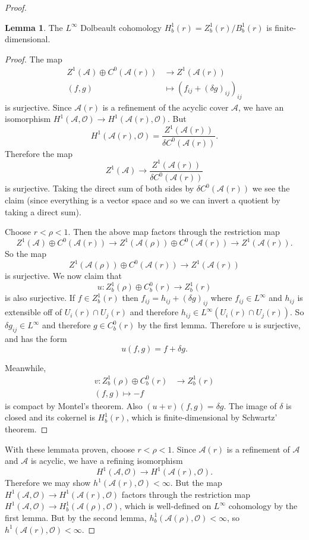 \documentclass[12pt]{book}
\newcommand{\Olo}{\mathscr O}
\theoremstyle{definition}
\newtheorem{lemma}[theorem]{Lemma}
\begin{document}
\begin{proof}
\begin{lemma}
The $L^\infty$ Dolbeault cohomology $H^1_b(r) = Z^1_b(r)/B_b^1(r)$ is finite-dimensional.
\end{lemma}
\begin{proof}
The map
\begin{align*}
Z^1(\mathscr A) \oplus C^0(\mathscr A(r)) &\to Z^1(\mathscr A(r))\\
(f, g) &\mapsto (f_{ij} + (\delta g)_{ij})_{ij}
\end{align*}
is surjective. Since $\mathscr A(r)$ is a refinement of the acyclic cover $\mathscr A$, we have an isomorphism $H^1(\mathscr A, \Olo) \to H^1(\mathscr A(r), \Olo)$.
But
$$H^1(\mathscr A(r), \Olo) = \frac{Z^1(\mathscr A(r))}{\delta C^0(\mathscr A(r))}.$$
Therefore the map
$$Z^1(\mathscr A) \to  \frac{Z^1(\mathscr A(r))}{\delta C^0(\mathscr A(r))}$$
is surjective.
Taking the direct sum of both sides by $\delta C^0(\mathscr A(r))$ we see the claim (since everything is a vector space and so we can invert a quotient by taking a direct sum).

Choose $r < \rho < 1$.
Then the above map factors through the restriction map
$$Z^1(\mathscr A) \oplus C^0(\mathscr A(r)) \to Z^1(\mathscr A(\rho)) \oplus C^0(\mathscr A(r)) \to Z^1(\mathscr A(r)).$$
So the map
$$Z^1(\mathscr A(\rho)) \oplus C^0(\mathscr A(r)) \to Z^1(\mathscr A(r))$$
is surjective.
We now claim that
$$u: Z^1_b(\rho) \oplus C^0_b(r) \to Z^1_b(r)$$
is also surjective.
If $f \in Z^1_b(r)$ then $f_{ij} = h_{ij} + (\delta g)_{ij}$ where $f_{ij} \in L^\infty$ and $h_{ij}$ is extensible off of $U_i(r) \cap U_j(r)$ and therefore $h_{ij} \in L^\infty(U_i(r) \cap U_j(r))$.
So $\delta g_{ij} \in L^\infty$ and therefore $g \in C^0_b(r)$ by the first lemma.
Therefore $u$ is surjective, and has the form
$$u(f, g) = f + \delta g.$$

Meanwhile,
\begin{align*}
v: Z^1_b(\rho) \oplus C^0_b(r) &\to Z^1_b(r)\\
(f, g) \mapsto -f
\end{align*}
is compact by Montel's theorem.
Also $(u + v)(f, g) = \delta g$.
The image of $\delta$ is closed and its cokernel is $H^1_b(r)$, which is finite-dimensional by Schwartz' theorem.
\end{proof}

With these lemmata proven, choose $r < \rho < 1$.
Since $\mathscr A(r)$ is a refinement of $\mathscr A$ and $\mathcal A$ is acyclic, we have a refining isomorphism
$$H^1(\mathscr A, \Olo) \to H^1(\mathscr A(r), \Olo).$$
Therefore we may show $h^1(\mathscr A(r), \Olo) < \infty$.
But the map $H^1(\mathscr A, \Olo) \to H^1(\mathscr A(r), \Olo)$ factors through the restriction map $H^1(\mathscr A, \Olo) \to H^1_b(\mathscr A(\rho), \Olo)$, which is well-defined on $L^\infty$ cohomology by the first lemma.
But by the second lemma, $h^1_b(\mathscr A(\rho), \Olo) < \infty$, so $h^1(\mathscr A(r), \Olo) < \infty$.
\end{proof}
\end{document}
